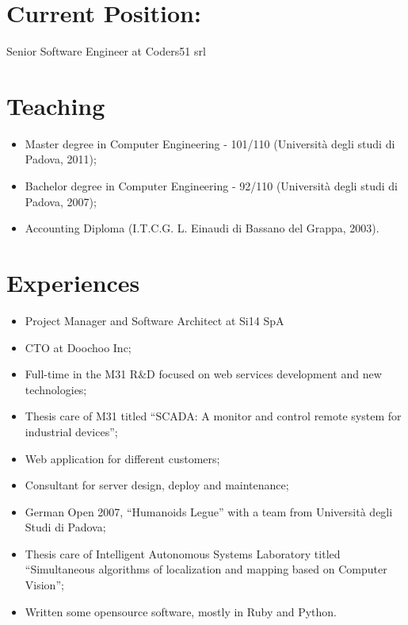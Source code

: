 \documentclass[pdftex, a4paper, 11pt]{article}
\begin{document}
\section*{Current Position:}

Senior Software Engineer at Coders51 srl

\section*{Teaching}
\begin{itemize}
\item Master degree in Computer Engineering - 101/110 (Universit\`a degli studi di Padova, 2011);
\item Bachelor degree in Computer Engineering - 92/110 (Universit\`a degli studi di Padova, 2007);
\item Accounting Diploma (I.T.C.G. L. Einaudi di Bassano del Grappa, 2003).
\end{itemize}

\section*{Experiences}
\begin{itemize}
\item Project Manager and Software Architect at Si14 SpA
\item CTO at Doochoo Inc;
\item Full-time in the M31 R\&D focused on web services development and new technologies;
\item Thesis care of M31 titled ``SCADA: A monitor and control remote system for industrial devices'';
\item Web application for different customers;
\item Consultant for server design, deploy and maintenance;
\item German Open 2007, ``Humanoids Legue'' with a team from Universit\`a
degli Studi di Padova;
\item Thesis care of Intelligent Autonomous Systems Laboratory titled ``Simultaneous
algorithms of localization and mapping based on Computer Vision'';
\item Written some opensource software, mostly in Ruby and Python.
\end{itemize}
\end{document}
